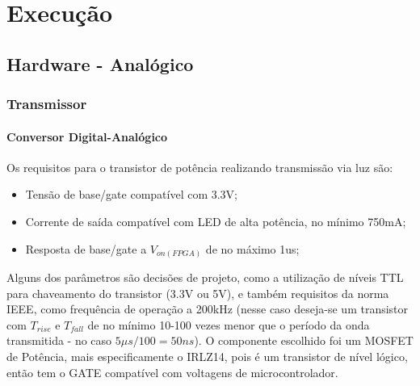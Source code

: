 	\chapter{Execução}\label{cap-execucao}
	
	\section{Hardware - Analógico}
	\subsection{Transmissor}
	\subsubsection{Conversor Digital-Analógico}
		 Os requisitos para o transistor de potência realizando transmissão via luz são:

		\begin{itemize}
			\item Tensão de base/gate compatível com 3.3V;
			\item Corrente de saída compatível com LED de alta potência, no mínimo 750mA;
			\item Resposta de base/gate a $V_{on(FPGA)}$ de no máximo 1us;
		\end{itemize}
		
		Alguns dos parâmetros são decisões de projeto, como a utilização de níveis TTL para chaveamento do transistor (3.3V ou 5V), e também requisitos da norma IEEE, como frequência de operação a 200kHz (nesse caso deseja-se um transistor com $T_{rise}$ e $T_{fall}$ de no mínimo 10-100 vezes menor que o período da onda transmitida - no caso $5\mu$$s/100 = 50ns$).
		O componente escolhido foi um MOSFET de Potência, mais especificamente o IRLZ14, pois é um transistor de nível lógico, então tem o GATE compatível com voltagens de microcontrolador. 
		
